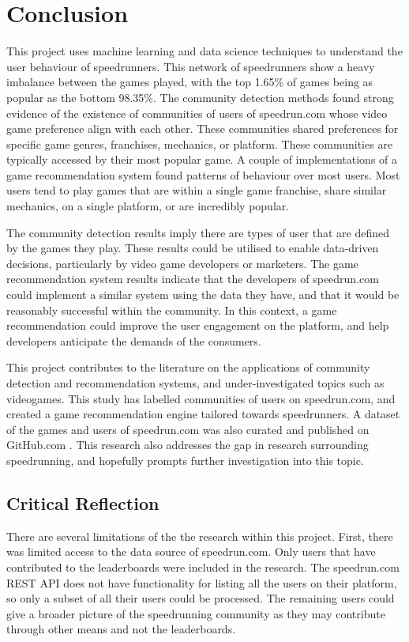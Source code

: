 \section{Conclusion}

This project uses machine learning and data science techniques to understand the user behaviour of speedrunners. This network of speedrunners show a heavy imbalance between the games played, with the top 1.65\% of games being as popular as the bottom 98.35\%. The community detection methods found strong evidence of the existence of communities of users of speedrun.com whose video game preference align with each other. These communities shared preferences for specific game genres, franchises, mechanics, or platform. These communities are typically accessed by their most popular game. A couple of implementations of a game recommendation system found patterns of behaviour over most users. Most users tend to play games that are within a single game franchise, share similar mechanics, on a single platform, or are incredibly popular.


The community detection results imply there are types of user that are defined by the games they play. These results could be utilised to enable data-driven decisions, particularly by video game developers or marketers. The game recommendation system results indicate that the developers of speedrun.com could implement a similar system using the data they have, and that it would be reasonably successful within the community. In this context, a game recommendation could improve the user engagement on the platform, and help developers anticipate the demands of the consumers.  


This project contributes to the literature on the applications of community detection and recommendation systems, and under-investigated topics such as videogames. This study has labelled communities of users on speedrun.com, and created a game recommendation engine tailored towards speedrunners. A dataset of the games and users of speedrun.com was also curated and published on GitHub.com \cite{myself}. This research also addresses the gap in research surrounding speedrunning, and hopefully prompts further investigation into this topic. 

\subsection{Critical Reflection}

There are several limitations of the the research within this project. First, there was limited access to the data source of speedrun.com. Only users that have contributed to the leaderboards were included in the research. The speedrun.com REST API does not have functionality for listing all the users on their platform, so only a subset of all their users could be processed. The remaining users could give a broader picture of the speedrunning community as they may contribute through other means and not the leaderboards.


